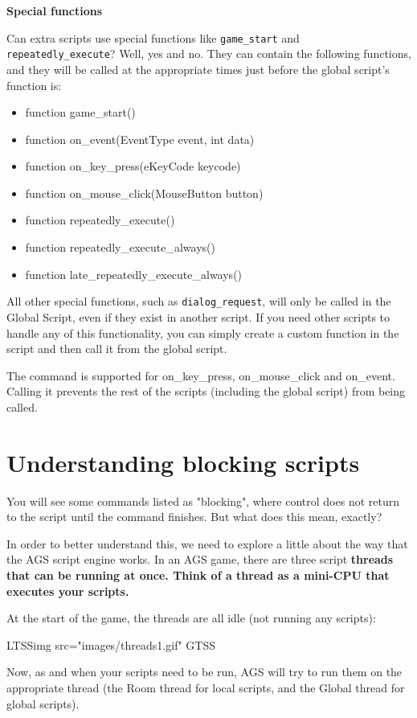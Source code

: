 \bf{Special functions}

Can extra scripts use special functions like \verb$game_start$ and \verb$repeatedly_execute$?
Well, yes and no. They can contain the following functions, and they will
be called at the appropriate times just before the global script's function is:
\begin{itemize}
\item function game_start()
\item function on_event(EventType event, int data)
\item function on_key_press(eKeyCode keycode)
\item function on_mouse_click(MouseButton button)
\item function repeatedly_execute()
\item function repeatedly_execute_always()
\item function late_repeatedly_execute_always()
\end{itemize}
All other special functions, such as \verb$dialog_request$, will only be called in
the Global Script, even if they exist in another script. If you need other scripts to
handle any of this functionality, you can simply create a custom function in the
script and then call it from the global script.

The  command is supported for on_key_press, on_mouse_click
and on_event. Calling it prevents the rest of the scripts (including the global script) from being called.


\section{Understanding blocking scripts}\label{BlockingScripts}%

You will see some commands listed as "blocking", where control does not return
to the script until the command finishes. But what does this mean, exactly?

In order to better understand this, we need to explore a little about the way
that the AGS script engine works. In an AGS game, there are three script \bf{threads}
that can be running at once. Think of a thread as a mini-CPU that executes your scripts.

At the start of the game, the threads are all idle (not running any scripts):

LTSSimg src="images/threads1.gif" GTSS

Now, as and when your scripts need to be run, AGS will try to run them on the
appropriate thread (the Room thread for local scripts, and the Global thread
for global scripts).

